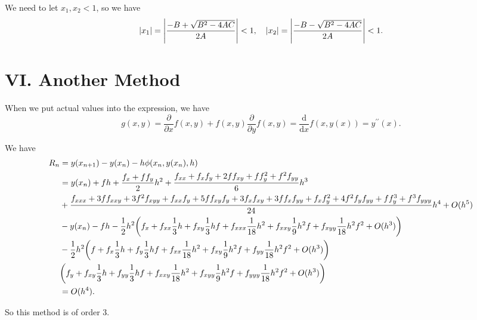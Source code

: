 \documentclass[a4paper]{article}
\begin{document}
We need to let $x_1, x_2 < 1$, so we have 
\begin{equation}
    \abs{x_1} = \abs{\frac{-B + \sqrt{B^2 - 4AC}}{2A}}<1, \quad \abs{x_2} = \abs{\frac{-B - \sqrt{B^2 - 4AC}}{2A}}<1.
\end{equation}


\section*{VI. Another Method}

When we put actual values into the expression, we have
\begin{equation}
    g(x,y) = \frac{\partial }{\partial x} f(x, y) + f(x, y) \frac{\partial}{\partial y} f(x, y) = \frac{\mathrm{d}}{\mathrm{d} x} f(x, y(x)) = y^{\prime \prime} (x). 
\end{equation}

We have
\begin{equation}
    \begin{aligned}
        R_n &= y(x_{n+1}) - y(x_n) - h\phi(x_n, y(x_n), h) \\
        &= y(x_n) + f h + \frac{f_x + f f_y}{2} h^2 + \frac{f_{xx} + f_xf_y +2ff_{xy}+ff_y^2+f^2f_{yy}}{6} h^3 \\
        &+ \frac{f_{xxx} + 3ff_{xxy} + 3f^2 f_{xyy} + f_{xx}f_y + 5ff_{xy}f_y + 3f_x f_{xy} + 3ff_x f_{yy} + f_x f_y^2 + 4f^2 f_y f_{yy} + ff_y^3 + f^3 f_{yyy}}{24}h^4 + O(h^5) \\
        &- y(x_n) - fh - \frac{1}{2} h^2 \qty(f_x + f_{xx} \frac{1}{3}h + f_{xy} \frac{1}{3}hf + f_{xxx} \frac{1}{18}h^2 + f_{xxy}\frac{1}{9}h^2f + f_{xyy} \frac{1}{18}h^2f^2 + O(h^3)) \\ 
        &- \frac{1}{2} h^2 \qty(f + f_x \frac{1}{3}h + f_y \frac{1}{3}hf + f_{xx} \frac{1}{18}h^2 + f_{xy} \frac{1}{9}h^2f + f_{yy} \frac{1}{18}h^2f^2 + O(h^3)) \\ 
        & \qty(f_y + f_{xy} \frac{1}{3}h + f_{yy} \frac{1}{3}hf + f_{xxy} \frac{1}{18}h^2 + f_{xyy} \frac{1}{9}h^2f + f_{yyy} \frac{1}{18}h^2f^2 + O(h^3)) \\
        &= O(h^4). 
    \end{aligned}
\end{equation}

So this method is of order 3.
\end{document}
